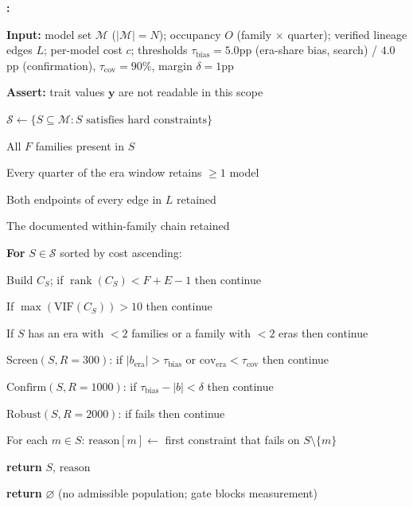 \documentclass[11pt]{article}
\theoremstyle{definition}
\theoremstyle{plain}
\newcounter{algstep}
\newenvironment{algsteps}{%
  \footnotesize
  \setcounter{algstep}{0}%
  \begin{list}{\textbf{\thealgstep:}}{%
    \usecounter{algstep}%
    \setlength{\labelwidth}{14pt}%
    \setlength{\labelsep}{4pt}%
    \setlength{\leftmargin}{20pt}%
    \setlength{\rightmargin}{0pt}%
    \setlength{\itemsep}{1pt}%
    \setlength{\parsep}{0pt}%
    \setlength{\topsep}{3pt}%
  }%
}{\end{list}}
\newcommand{\algind}[1]{\hspace*{#1.1em}}
\newcommand{\algkw}[1]{\textbf{#1}}
\begin{document}
\begin{algorithm}[!htbp]
\caption{Outcome-independent study-population design}
\label{alg:g3}
\begin{algsteps}
\item \algkw{Input:} model set $\mathcal{M}$ ($|\mathcal{M}| = N$); occupancy $O$ (family $\times$ quarter); verified lineage edges $L$; per-model cost $c$; thresholds $\tau_{\text{bias}} = 5.0$pp (era-share bias, search) / $4.0$pp (confirmation), $\tau_{\text{cov}} = 90\%$, margin $\delta = 1$pp
\item \algkw{Assert:} trait values $\mathbf{y}$ are not readable in this scope
\item $\mathcal{S} \leftarrow \{S \subseteq \mathcal{M} : S \text{ satisfies hard constraints}\}$
\item \algind{1} All $F$ families present in $S$
\item \algind{1} Every quarter of the era window retains $\geq 1$ model
\item \algind{1} Both endpoints of every edge in $L$ retained
\item \algind{1} The documented within-family chain retained
\item \algkw{For} $S \in \mathcal{S}$ sorted by cost ascending:
\item \algind{1} Build $C_S$; if $\operatorname{rank}(C_S) < F + E - 1$ then continue
\item \algind{1} If $\max(\text{VIF}(C_S)) > 10$ then continue
\item \algind{1} If $S$ has an era with $< 2$ families or a family with $< 2$ eras then continue
\item \algind{1} $\text{Screen}(S, R=300)$: if $|b_{\text{era}}| > \tau_{\text{bias}}$ or $\text{cov}_{\text{era}} < \tau_{\text{cov}}$ then continue
\item \algind{1} $\text{Confirm}(S, R=1000)$: if $\tau_{\text{bias}} - |b| < \delta$ then continue
\item \algind{1} $\text{Robust}(S, R=2000)$: if fails then continue
\item \algind{1} For each $m \in S$: $\text{reason}[m] \leftarrow$ first constraint that fails on $S \setminus \{m\}$
\item \algkw{return} $S$, $\text{reason}$
\item \algkw{return} $\varnothing$ (no admissible population; gate blocks measurement)
\end{algsteps}
\end{algorithm}
\end{document}
